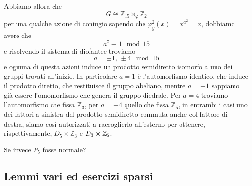 \begin{multicols}{2}
Abbiamo allora che
\[ G \cong \mathbb{Z}_{15} \rtimes_\varphi \mathbb{Z}_2 \]
per una qualche azione di coniugio 
sapendo che $ \varphi_y^2(x) = x^{a^2} = x $, dobbiamo avere che $$  a^2 \equiv 1 \mod{15}  $$ e risolvendo il sistema di diofantee troviamo
\[ a = \pm 1,\, \pm 4 \mod{15} \]
e ognuna di questa azioni induce un prodotto semidiretto isomorfo a uno dei gruppi trovati all'inizio. In particolare $ a = 1 $ è l'automorfismo identico, che induce il prodotto diretto, che restituisce il gruppo abeliano, mentre $ a = -1 $ sappiamo già essere l'omomorfismo che genera il gruppo diedrale. Per $ a = 4 $ troviamo l'automorfismo che fissa $ \mathbb{Z}_3 $, per $ a = -4 $ quello che fissa $ \mathbb{Z}_5 $, in entrambi i casi uno dei fattori a sinistra del prodotto semidiretto commuta anche col fattore di destra, siamo così autorizzati a raccoglierlo all'esterno per ottenere, rispettivamente, $ D_5\times\mathbb{Z}_3 $ e $ D_{3}\times\mathbb{Z}_5 $.
	
Se invece $ P_5 $ fosse normale?
	
\end{multicols}

\subsection{Lemmi vari ed esercizi sparsi}

